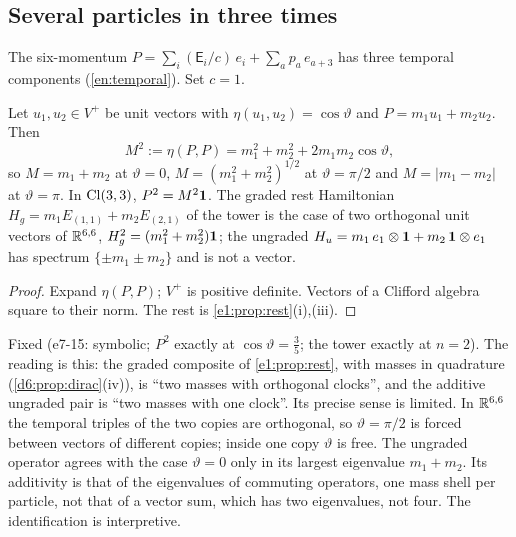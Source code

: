 \subsection{Several particles in three times}
\label{e7:sec:sixmomenta}

The six-momentum $P=\sum_i(\mathsf E_i/c)\,e_i+\sum_ap_a\,e_{a+3}$ has three temporal components (\cref{en:temporal}). Set $c=1$.

\begin{proposition}
\label{e7:prop:sixmass}
Let $u_1,u_2\in V^+$ be unit vectors with $\eta(u_1,u_2)=\cos\vartheta$ and $P=m_1u_1+m_2u_2$. Then
\[
M^2:=\eta(P,P)=m_1^2+m_2^2+2m_1m_2\cos\vartheta ,
\]
so $M=m_1+m_2$ at $\vartheta=0$, $M=(m_1^2+m_2^2)^{1/2}$ at $\vartheta=\pi/2$ and $M=|m_1-m_2|$ at $\vartheta=\pi$. In $\mathrm{Cl}(3,3)$, $P^2=M^2\mathbf 1$.
The graded rest Hamiltonian $H_g=m_1E_{(1,1)}+m_2E_{(2,1)}$ of the tower is the case of two orthogonal unit vectors of $\mathbb{R}^{6,6}$, $H_g^2=(m_1^2+m_2^2)\mathbf 1$;
the ungraded $H_u=m_1\,e_1\otimes\mathbf 1+m_2\,\mathbf 1\otimes e_1$ has spectrum $\{\pm m_1\pm m_2\}$ and is not a vector.
\end{proposition}

\begin{proof}
Expand $\eta(P,P)$; $V^+$ is positive definite. Vectors of a Clifford algebra square to their norm. The rest is \cref{e1:prop:rest}(i),(iii).
\end{proof}

Fixed (e7-15: symbolic; $P^2$ exactly at $\cos\vartheta=\tfrac35$; the tower exactly at $n=2$). The reading is this: the graded composite of
\cref{e1:prop:rest}, with masses in quadrature (\cref{d6:prop:dirac}(iv)), is ``two masses with orthogonal clocks'', and the additive
ungraded pair is ``two masses with one clock''. Its precise sense is limited. In $\mathbb{R}^{6,6}$ the temporal triples of the two copies are orthogonal,
so $\vartheta=\pi/2$ is forced between vectors of different copies; inside one copy $\vartheta$ is free. The ungraded operator agrees with the
case $\vartheta=0$ only in its largest eigenvalue $m_1+m_2$. Its additivity is that of the eigenvalues of commuting operators, one mass shell per
particle, not that of a vector sum, which has two eigenvalues, not four. The identification is interpretive.

